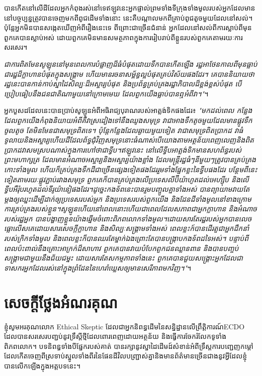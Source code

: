 \documentclass[10pt,twocolumn,letterpaper]{article}
\begin{document}
{បានកើតនៅលើដីដែលអ្នកកំពុងរស់នៅទេ​ឥឡូវនេះអ្នកផ្ទាល់ព្រមទាំងទីក្រុងទាំងមូលរបស់អ្នកដែលមាននៅបច្ចុប្បន្នត្រូវបានចេញមកពីពូជដើមទាំងនោះ នេះគឺបណ្តាលមកពីគ្រាប់ពូជតូចមួយដែលនៅសល់។ ប៉ុន្តែអ្នកមិនបានសង្កេតឃើញអំពីរឿងនេះទេ ពីព្រោះជាច្រើនជំនាន់ អ្នកដែលនៅសល់ពីការស្លាប់ពីមុនពួកគេបានស្លាប់អស់ ដោយពួកគេមិនមានសមត្ថភាពក្នុងការរៀបរាប់ពីខ្លួនរបស់ពួកគេតាមរយៈការសរសេរ។}

\textit{ជាការពិតមែនសូឡុន​នៅមុនពេលការបំផ្លាញដ៏ធំបំផុតដោយទឹកបានកើតឡើង រដ្ឋអាថែនកាលពីមុនធ្លាប់ជារដ្ឋដ៏ក្លាហានបំផុតក្នុងសង្គ្រាម ហើយមានរចនាសម្ព័ន្ធល្អបំផុតគ្រប់វិស័យផងដែរ។ គេបាននិយាយថារដ្ឋនេះបានកាន់កាប់ស្នាដៃសិល្បៈដ៏អស្ចារ្យបំផុត និងប្រព័ន្ធគ្រប់គ្រងរដ្ឋាភិបាលដ៏ខ្ពង់ខ្ពស់បំផុត បើប្រៀបធៀបនឹងជនជាតិណាមួយនៅក្រោមមេឃ ដែលពួកយើងធ្លាប់បានឮអំពីវា។"}។

អ្នកបួសដដែលនេះបានប្រាប់សូឡូនអំពីអធិរាជ្យបុរាណរបស់អាត្លង់ទិកផងដែរ៖ \textit{"មកដល់ពេល កន្លែងដែលពួកយើងកំពុងនិយាយអំពីគឺវាស្រដៀងទៅនឹងឈូងសមុទ្រ វាជាអាងទឹកតូចមួយដែលមានផ្លូវទឹកចូលតូច តែមិនមែនជាសមុទ្រពិតទេ។ ប៉ុន្តែកន្លែងដែលឆ្ងាយមួយទៀត វាជាសមុទ្រពិតប្រាកដ វាធំទូលាយនិងអស្ចារ្យហើយដីដែលព័ទ្ធជុំវិញសមុទ្រនោះធំណាស់​បើយោងតាមអត្ថន័យពេញលេញនិងពិតប្រាកដ​វាសមស្របណាស់ក្នុងការហៅថាជាទ្វីប។ឥឡូវនេះ នៅលើទ្វីបអាត្លង់ទិកមានសហព័ន្ធរបស់ព្រះមហាក្សត្រ ដែលមានអំណាចអស្ចារ្យនិងអស្ចារ្យយ៉ាងខ្លាំង ដែលមន្ត្រីរដ្ឋធំៗនីមួយៗត្រូវបានគ្រប់គ្រងកោះទាំងមូល ហើយក៏គ្រប់គ្រងទឹកដីជាច្រើនផ្សេងទៀតផងដែររួមទាំងផ្នែកខ្លះនៃទ្វីបផងដែរ បន្ថែមពីនេះទៀតតាមរយៈផ្លូវភ្ជាប់រវាងសមុទ្រ ពួកគេក៏បានគ្រប់គ្រងលើប្រទេសលីប៊ីយ៉ាហូតដល់អេហ្ស៊ីប និងលើទ្វីបអឺរ៉ុបរហូតដល់ទីរូយ៉ានៀផងដែរ។​ដូច្នេះកងទ័ពនេះបានរួមបញ្ចូលគ្នាទាំងអស់ បានព្យាយាមវាយតែម្តងឲ្យឈ្នះ​ដើម្បីដាក់ឲ្យប្រទេសរបស់អ្នក និងប្រទេសរបស់ពួកយើង និងដែនដីទាំងមូលនៅខាងក្រោមការគ្រប់គ្រងរបស់ខ្លួន។​សូឡូនហើយនៅពេលនោះហើយ​ជាពេលដែលសភាពជាអ្នកក្លាហាន និងអំណាចរបស់រដ្ឋអ្នក បានបង្ហាញខ្លួនយ៉ាងឆ្នើមចំពោះពិភពលោកទាំងមូល។​ដោយសារតែរដ្ឋរបស់អ្នកបានលេចធ្លោលើសគេដោយសារសេចក្តីក្លាហាន និងសិល្បៈសង្គ្រាមទាំងអស់ ពេលខ្លះក៍បានដើរតួជាអ្នកដឹកនាំរបស់ក្រិកទាំងមូល និងពេលខ្លះក៏បានឈរតែម្នាក់ឯង​ព្រោះតែបានបង្ក្រាបកងទ័ពដទៃអស់។ បន្ទាប់ពីពេលប៉ះពាល់នឹងគ្រោះអាក្រក់ដ៏សាហាវ ពួកគេបានវាយបំបែកពួកជនឈ្លានពាន និងបានបញ្ចប់សង្គ្រាមជាមួយនឹងជ័យជម្នះ ដោយសារតែសកម្មភាពទាំងនេះ ពួកគេបានជួយសង្គ្រោះអ្នកដែលជាទាសករ​អ្នកដែលរស់នៅក្នុងព្រំដែននៃហេរ៉ាឃ្លេសឲ្យមានសេរីភាពមកវិញ។"}។

\section{សេចក្តីថ្លែងអំណរគុណ}

ខ្ញុំសូមអរគុណលោក Ethical Skeptic ដែលជាអ្នកនិពន្ធដើមនៃសន្និដ្ឋានលើព្រឹត្តិការណ៍ECDO ដែលបានសរសេរបញ្ជប់នូវទ្រឹស្តីថ្មីដែលពោរពេញដោយអត្ថន័យ និងធ្វើការចែករំលែកទូទាំងពិភពលោក។ បទនិពន្ធទាំងបីផ្នែករបស់គាត់ \cite{1} បានរក្សានូវស្នាដៃដើមដ៍សំខាន់អំពីទ្រឹស្តការបញ្ជេញកម្តៅដែលកើតចេញពីស្រទាប់ស្នូលទាំងពីរនៃផែនដីវិលបញ្ជ្រាស់គ្នានិងមានព័ត៌មានច្រើនជាងនូវអ្វីដែលខ្ញុំបានលើកឡើងក្នុងអត្តបទនេះ។
\end{document}
